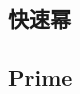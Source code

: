\documentclass[a4paper,10pt,twocolumn,oneside]{article}
\begin{document}
    \subsection{快速幂}
    


    \subsection{Prime}
    







\end{document}
